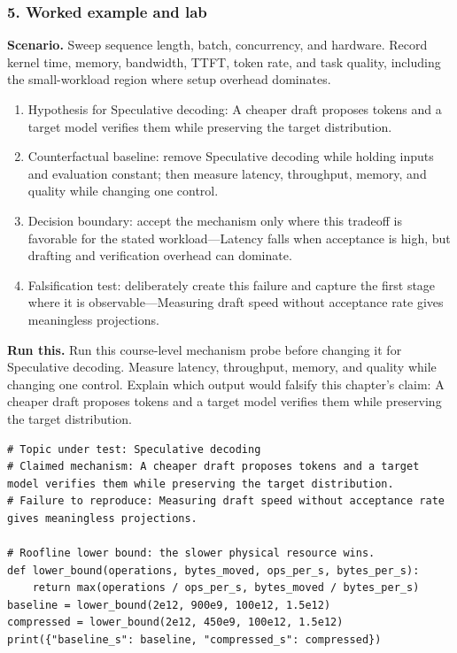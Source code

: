 \subsubsection*{5. Worked example and lab}
\textbf{Scenario.} Sweep sequence length, batch, concurrency, and hardware. Record kernel time, memory, bandwidth, TTFT, token rate, and task quality, including the small-workload region where setup overhead dominates.
\begin{enumerate}
\item Hypothesis for Speculative decoding: A cheaper draft proposes tokens and a target model verifies them while preserving the target distribution.
\item Counterfactual baseline: remove Speculative decoding while holding inputs and evaluation constant; then measure latency, throughput, memory, and quality while changing one control.
\item Decision boundary: accept the mechanism only where this tradeoff is favorable for the stated workload—Latency falls when acceptance is high, but drafting and verification overhead can dominate.
\item Falsification test: deliberately create this failure and capture the first stage where it is observable—Measuring draft speed without acceptance rate gives meaningless projections.
\end{enumerate}
\textbf{Run this.} Run this course-level mechanism probe before changing it for Speculative decoding. Measure latency, throughput, memory, and quality while changing one control. Explain which output would falsify this chapter's claim: A cheaper draft proposes tokens and a target model verifies them while preserving the target distribution.
\begin{Verbatim}[fontsize=\scriptsize]
# Topic under test: Speculative decoding
# Claimed mechanism: A cheaper draft proposes tokens and a target model verifies them while preserving the target distribution.
# Failure to reproduce: Measuring draft speed without acceptance rate gives meaningless projections.

# Roofline lower bound: the slower physical resource wins.
def lower_bound(operations, bytes_moved, ops_per_s, bytes_per_s):
    return max(operations / ops_per_s, bytes_moved / bytes_per_s)
baseline = lower_bound(2e12, 900e9, 100e12, 1.5e12)
compressed = lower_bound(2e12, 450e9, 100e12, 1.5e12)
print({"baseline_s": baseline, "compressed_s": compressed})
\end{Verbatim}
